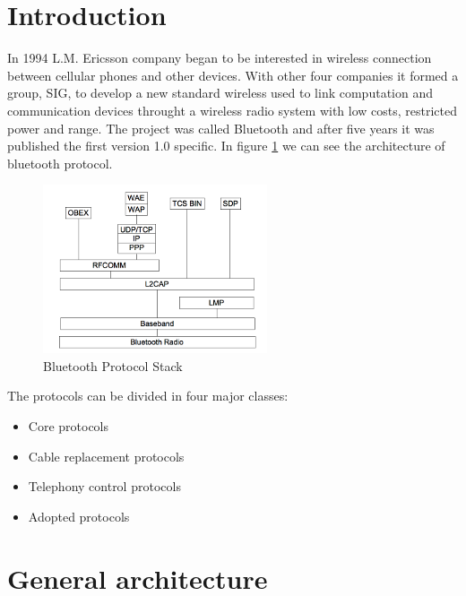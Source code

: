 \documentclass[conference]{./IEEEtran}
\begin{document}
\section{Introduction}
In 1994 L.M. Ericsson company began to be interested in wireless connection between cellular phones and other devices. With other four companies it formed a group, SIG, to develop a new standard wireless used to link computation and communication devices throught a wireless radio system with low costs, restricted power and range. The project was called Bluetooth and after five years it was published the first version 1.0 specific.
In figure \ref{stack} we can see the architecture of bluetooth protocol.
\begin{figure}[h]
\centering
\includegraphics[scale = 0.8]{stacksimple1.png}
\caption{Bluetooth Protocol Stack}
\label{stack}
\end{figure}

The protocols can be divided in four major classes:
\begin{itemize}
\item Core protocols
\item Cable replacement protocols
\item Telephony control protocols
\item Adopted protocols
\end{itemize}



\section{General architecture}
\end{document}
